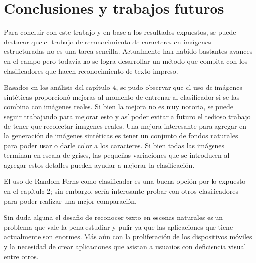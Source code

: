 \newpage
\section{Conclusiones y trabajos futuros}

	Para concluir con este trabajo y en base a los resultados expuestos, se puede destacar que el trabajo de reconocimiento de caracteres en imágenes estructuradas no es una tarea sencilla. Actualmente han habido bastantes avances en el campo pero todavía no  se logra desarrollar un método que compita con los clasificadores que hacen reconocimiento de texto impreso.
	
	Basados en los análisis del capítulo 4, se pudo observar que el uso de imágenes sintéticas proporcionó mejoras al momento de entrenar al clasificador si se las combina con imágenes reales. Si bien la mejora no es muy notoria, se puede seguir trabajando para mejorar esto y así poder evitar a futuro el tedioso trabajo de tener que recolectar imágenes reales. Una mejora interesante para agregar en la generación de imágenes sintéticas es tener un conjunto de fondos naturales para poder usar o darle color a los caracteres. Si bien todas las imágenes terminan en escala de grises, las pequeñas variaciones que se introducen al agregar estos detalles pueden ayudar a mejorar la clasificación.
	
	El uso de Random Ferns como clasificador es una buena opción por lo expuesto en el capítulo 2; sin embargo, sería interesante probar con otros clasificadores para poder realizar una mejor comparación.
	
	Sin duda alguna el desafio de reconocer texto en escenas naturales es un problema que vale la pena estudiar y pulir ya que las aplicaciones que tiene actualmente son enormes. Más aún con la proliferación de los dispositivos móviles y la necesidad de crear aplicaciones que asistan a usuarios con deficiencia visual entre otros.